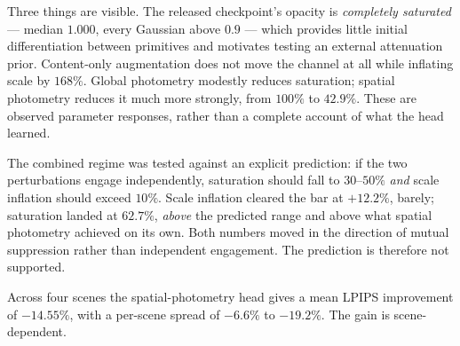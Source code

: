 Three things are visible. The released checkpoint's opacity is
\emph{completely saturated} --- median $1.000$, every Gaussian above $0.9$ ---
which provides little initial differentiation between primitives and
motivates testing an external attenuation prior. Content-only
augmentation does not move the channel at all while inflating scale by
$168\%$. Global photometry modestly reduces saturation; spatial photometry
reduces it much more strongly, from $100\%$ to $42.9\%$. These are observed
parameter responses, rather than a complete account of what the head learned.

The combined regime was tested against an explicit prediction: if the two
perturbations engage independently, saturation should fall to $30$--$50\%$
\emph{and} scale inflation should exceed $10\%$. Scale inflation cleared the
bar at $+12.2\%$, barely; saturation landed at $62.7\%$, \emph{above} the
predicted range and above what spatial photometry achieved on its own. Both
numbers moved in the direction of mutual suppression rather than independent
engagement. The prediction is therefore not supported.

Across four scenes the spatial-photometry
head gives a mean LPIPS improvement of $-14.55\%$, with a per-scene spread of
$-6.6\%$ to $-19.2\%$. The gain is scene-dependent.
